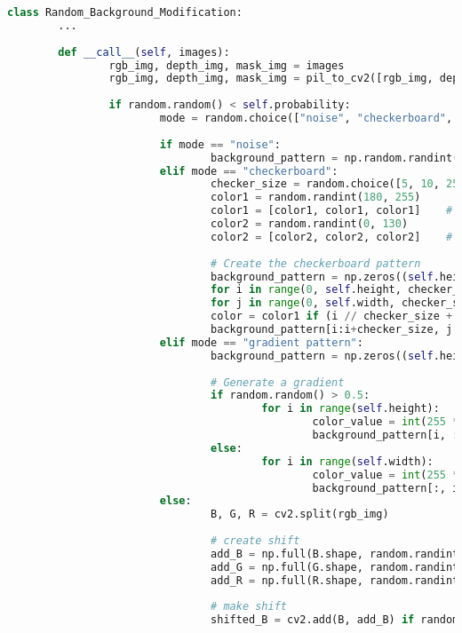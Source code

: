 		\begin{lstlisting}[language=Python,caption=Random Augmentation of the Background using cv2 in Python, label=lst:bg-augmentation]
class Random_Background_Modification:
		...
		
		def __call__(self, images):
				rgb_img, depth_img, mask_img = images
				rgb_img, depth_img, mask_img = pil_to_cv2([rgb_img, depth_img, mask_img])
				
				if random.random() < self.probability:
						mode = random.choice(["noise", "checkerboard", "gradient pattern", "color shift"])
						
						if mode == "noise":
								background_pattern = np.random.randint(0, 256, (self.height, self.width, 3), dtype=np.uint8)
						elif mode == "checkerboard":
								checker_size = random.choice([5, 10, 25, 50])
								color1 = random.randint(180, 255)
								color1 = [color1, color1, color1]    # Brighter Color
								color2 = random.randint(0, 130)
								color2 = [color2, color2, color2]    # Darker Color
							
								# Create the checkerboard pattern
								background_pattern = np.zeros((self.height, self.width, 3), dtype=np.uint8)
								for i in range(0, self.height, checker_size):
								for j in range(0, self.width, checker_size):
								color = color1 if (i // checker_size + j // checker_size) % 2 == 0 else color2
								background_pattern[i:i+checker_size, j:j+checker_size] = color
						elif mode == "gradient pattern":
								background_pattern = np.zeros((self.height, self.width, 3), dtype=np.uint8)
							
								# Generate a gradient
								if random.random() > 0.5:
										for i in range(self.height):
												color_value = int(255 * (i / self.height))
												background_pattern[i, :] = [color_value, color_value, color_value]
								else:
										for i in range(self.width):
												color_value = int(255 * (i / self.width))
												background_pattern[:, i] = [color_value, color_value, color_value]
						else:
								B, G, R = cv2.split(rgb_img)
							
								# create shift
								add_B = np.full(B.shape, random.randint(10, 150), dtype=np.uint8)
								add_G = np.full(G.shape, random.randint(10, 150), dtype=np.uint8)
								add_R = np.full(R.shape, random.randint(10, 150), dtype=np.uint8)
								
								# make shift
								shifted_B = cv2.add(B, add_B) if random.random() > 0.5 else cv2.subtract(B, add_B)
								

\end{lstlisting}
